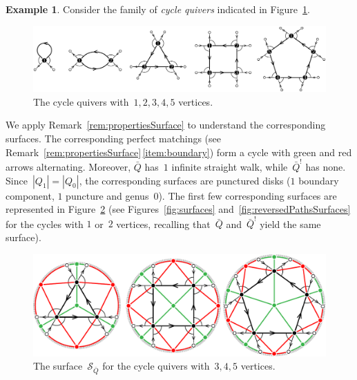 \documentclass{amsart}
\theoremstyle{definition}
\newtheorem{example}[theorem]{Example}
\newcommand{\fref}[1]{Figure~\ref{#1}} %
\newcommand{\darkblue}{\color{darkblue}} %
\newcommand{\defn}[1]{\textsl{\darkblue #1}} %
\newcommand{\surface}{\mathcal{S}} %
\newcommand{\koszul}{^!} %
\begin{document}
\begin{example}
\label{exm:cycle}
Consider the family of \defn{cycle quivers} indicated in \fref{fig:cyclesQuivers}.

\begin{figure}[H]
	\capstart
	\centerline{\includegraphics[scale=.45]{cyclesQuivers}}
	\caption{The cycle quivers with~$1, 2, 3, 4, 5$ vertices.}
	\label{fig:cyclesQuivers}
\end{figure}

We apply Remark~\ref{rem:propertiesSurface} to understand the corresponding surfaces.
The corresponding perfect matchings (see Remark~\ref{rem:propertiesSurface}\,\eqref{item:boundary}) form a cycle with green and red arrows alternating.
Moreover, $\bar Q$ has~$1$ infinite straight walk, while~$\bar Q\koszul$ has none.
Since~$|Q_1| = |Q_0|$, the corresponding surfaces are punctured disks ($1$ boundary component, $1$ puncture and genus~$0$).
The first few corresponding surfaces are represented in \fref{fig:cyclesSurfaces} (see Figures~\ref{fig:surfaces} and~\ref{fig:reversedPathsSurfaces} for the cycles with $1$ or~$2$ vertices, recalling that~$\bar Q$ and~$\bar Q\koszul$ yield the same surface).

\begin{figure}[h]
	\capstart
	\centerline{\includegraphics[scale=.7]{cyclesSurfacesBis}}
	\caption{The surface~$\surface_{\bar Q}$ for the cycle quivers with~$3, 4, 5$ vertices.}
	\label{fig:cyclesSurfaces}
\end{figure}
\end{example}
\end{document}
